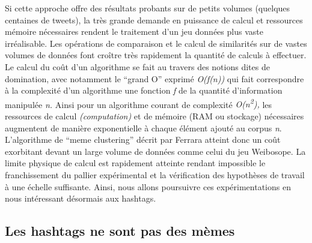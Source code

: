 Si cette approche offre des résultats probants sur de petits volumes (quelques centaines de tweets), la très grande demande en puissance de calcul et ressources mémoire nécessaires rendent le traitement d{\textquoteright}un jeu données plus vaste irréalisable. Les opérations de comparaison et le calcul de similarités sur de vastes volumes de données font cro\^itre très rapidement la quantité de calculs à effectuer. Le calcul du co\^ut d{\textquoteright}un algorithme se fait au travers des notions dites de domination, avec notamment le {\textquotedblleft}grand O{\textquotedblright} exprimé \textit{O(f(n)) }qui fait correspondre à la complexité d{\textquoteright}un algorithme une fonction \textit{f} de la quantité d{\textquoteright}information manipulée \textit{n. }Ainsi pour un algorithme courant de complexité \textit{O(n}\textit{\textsuperscript{2}}\textit{), }les ressources de calcul \textit{(computation)} et de mémoire (RAM ou stockage) nécessaires augmentent de manière exponentielle à chaque élément ajouté au corpus \textit{n}. L{\textquoteright}algorithme de {\textquotedblleft}meme clustering{\textquotedblright} décrit par Ferrara atteint donc un co\^ut exorbitant devant un large volume de données comme celui du jeu Weibosope. La limite physique de calcul est rapidement atteinte rendant impossible le franchissement du pallier expérimental et la vérification des hypothèses de travail à une échelle suffisante. Ainsi, nous allons poursuivre ces expérimentations en nous intéressant désormais aux hashtags.

\subsection[Les hashtags ne sont pas des mèmes]{Les hashtags ne sont pas des mèmes}
\label{sec:hashtags}

